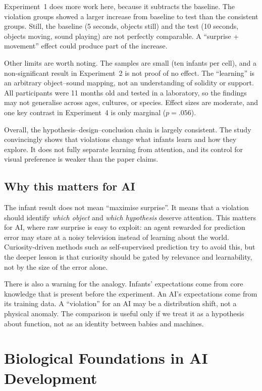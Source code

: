 \documentclass{article}
\begin{document}
Experiment~1 does more work here, because it subtracts the baseline. The violation groups
showed a larger increase from baseline to test than the consistent groups. Still, the
baseline (5 seconds, objects still) and the test (10 seconds, objects moving, sound
playing) are not perfectly comparable. A ``surprise + movement'' effect could produce part
of the increase.

Other limits are worth noting. The samples are small (ten infants per cell), and a
non-significant result in Experiment~2 is not proof of no effect. The ``learning'' is an
arbitrary object--sound mapping, not an understanding of solidity or support. All
participants were 11 months old and tested in a laboratory, so the findings may not
generalise across ages, cultures, or species. Effect sizes are moderate, and one key
contrast in Experiment~4 is only marginal ($p=.056$).

Overall, the hypothesis--design--conclusion chain is largely consistent. The study
convincingly shows that violations change what infants learn and how they explore. It does
not fully separate learning from attention, and its control for visual preference is
weaker than the paper claims.

\subsection{Why this matters for AI}

The infant result does not mean ``maximise surprise''. It means that a violation should
identify \emph{which object} and \emph{which hypothesis} deserve attention. This matters
for AI, where raw surprise is easy to exploit: an agent rewarded for prediction error may
stare at a noisy television instead of learning about the world. Curiosity-driven methods
such as self-supervised prediction \citep{pathak2017curiosity} try to avoid this, but the
deeper lesson is that curiosity should be gated by relevance and learnability, not by the
size of the error alone.

There is also a warning for the analogy. Infants' expectations come from core knowledge
that is present before the experiment. An AI's expectations come from its training data.
A ``violation'' for an AI may be a distribution shift, not a physical anomaly. The
comparison is useful only if we treat it as a hypothesis about function, not as an identity
between babies and machines.

\section{Biological Foundations in AI Development}\label{sec:bio}
\end{document}
